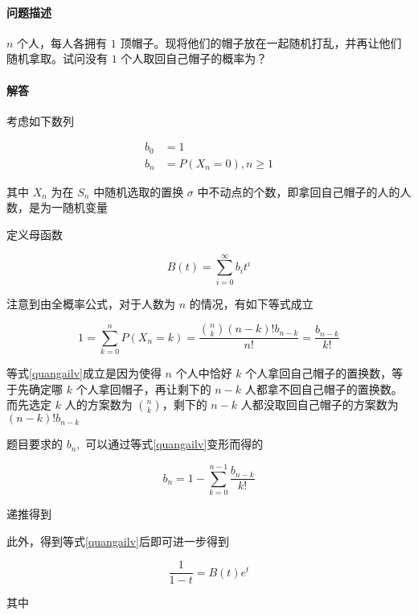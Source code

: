 \documentclass[a4paper, 11pt]{article} %
\begin{document}
\paragraph{问题描述}

$n$ 个人，每人各拥有 $1$ 顶帽子。现将他们的帽子放在一起随机打乱，并再让他们随机拿取。试问没有 $1$ 个人取回自己帽子的概率为？

\paragraph{解答}

考虑如下数列

\begin{align*}
	b_0 &=1 \\
	b_n &=P(X_n=0), n\ge 1
\end{align*}

其中 $X_n$ 为在 $S_n$ 中随机选取的置换 $\sigma$ 中不动点的个数，即拿回自己帽子的人的人数，是为一随机变量

定义母函数

\begin{equation*}
	B(t)=\sum\limits_{i=0}^{\infty}b_it^i
\end{equation*}

注意到由全概率公式，对于人数为 $n$ 的情况，有如下等式成立

\begin{equation}
	\label{quangailv}
	1=\sum\limits_{k=0}^nP(X_n=k)=\frac{\binom{n}{k}(n-k)!b_{n-k}}{n!}=\frac{b_{n-k}}{k!}
\end{equation}

等式\ref{quangailv}成立是因为使得 $n$ 个人中恰好 $k$ 个人拿回自己帽子的置换数，等于先确定哪 $k$ 个人拿回帽子，再让剩下的 $n-k$ 人都拿不回自己帽子的置换数。而先选定 $k$ 人的方案数为 $\binom{n}{k}$，剩下的 $n-k$ 人都没取回自己帽子的方案数为 $(n-k)!b_{n-k}$

题目要求的 $b_n,$ 可以通过等式\ref{quangailv}变形而得的 

\begin{equation*}
	b_n=1-\sum\limits_{k=0}^{n-1}\frac{b_{n-k}}{k!}
\end{equation*}

递推得到

此外，得到等式\ref{quangailv}后即可进一步得到

\begin{equation}
	\label{muhanshu}
	\frac{1}{1-t}=B(t)e^t
\end{equation}

其中 
\end{document}
